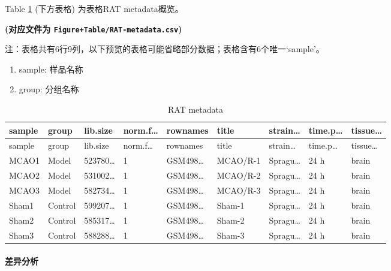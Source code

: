 \documentclass[
]{article}
\providecommand{\tightlist}{%
  \setlength{\itemsep}{0pt}\setlength{\parskip}{0pt}}
\begin{document}
Table \ref{tab:RAT-metadata} (下方表格) 为表格RAT metadata概览。

\textbf{(对应文件为 \texttt{Figure+Table/RAT-metadata.csv})}

\begin{center}\begin{tcolorbox}[colback=gray!10, colframe=gray!50, width=0.9\linewidth, arc=1mm, boxrule=0.5pt]注：表格共有6行9列，以下预览的表格可能省略部分数据；表格含有6个唯一`sample'。
\end{tcolorbox}
\end{center}
\begin{center}\begin{tcolorbox}[colback=gray!10, colframe=gray!50, width=0.9\linewidth, arc=1mm, boxrule=0.5pt]\begin{enumerate}\tightlist
\item sample:  样品名称
\item group:  分组名称
\end{enumerate}\end{tcolorbox}
\end{center}

\begin{longtable}[]{@{}lllllllll@{}}
\caption{\label{tab:RAT-metadata}RAT metadata}\tabularnewline
\toprule
sample & group & lib.size & norm.f\ldots{} & rownames & title & strain\ldots{} & time.p\ldots{} & tissue\ldots{}\tabularnewline
\midrule
\endfirsthead
\toprule
sample & group & lib.size & norm.f\ldots{} & rownames & title & strain\ldots{} & time.p\ldots{} & tissue\ldots{}\tabularnewline
\midrule
\endhead
MCAO1 & Model & 523780\ldots{} & 1 & GSM498\ldots{} & MCAO/R-1 & Spragu\ldots{} & 24 h & brain\tabularnewline
MCAO2 & Model & 531002\ldots{} & 1 & GSM498\ldots{} & MCAO/R-2 & Spragu\ldots{} & 24 h & brain\tabularnewline
MCAO3 & Model & 582734\ldots{} & 1 & GSM498\ldots{} & MCAO/R-3 & Spragu\ldots{} & 24 h & brain\tabularnewline
Sham1 & Control & 599207\ldots{} & 1 & GSM498\ldots{} & Sham-1 & Spragu\ldots{} & 24 h & brain\tabularnewline
Sham2 & Control & 585317\ldots{} & 1 & GSM498\ldots{} & Sham-2 & Spragu\ldots{} & 24 h & brain\tabularnewline
Sham3 & Control & 588288\ldots{} & 1 & GSM498\ldots{} & Sham-3 & Spragu\ldots{} & 24 h & brain\tabularnewline
\bottomrule
\end{longtable}

\hypertarget{ux5deeux5f02ux5206ux6790}{%
\paragraph{差异分析}\label{ux5deeux5f02ux5206ux6790}}
\end{document}
